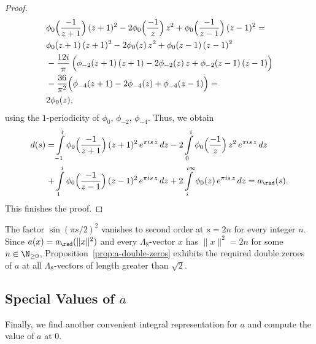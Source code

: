 \begin{proof}
\begin{align}&\phi_0\Big(\frac{-1}{z+1}\Big)\,(z+1)^2-2\phi_0\Big(\frac{-1}{z}\Big)\,z^2+
\phi_0\Big(\frac{-1}{z-1}\Big)\,(z-1)^2=\notag\\
&\phi_0(z+1)\,(z+1)^2-2\phi_0(z)\,z^2+\phi_0(z-1)\,(z-1)^2\notag\\
&-\frac{12i}{\pi}\,\Big(\phi_{-2}(z+1)\,(z+1)-2\phi_{-2}(z)\,z+\phi_{-2}(z-1)\,(z-1)\Big)\notag\\
&-\frac{36}{\pi^2}\Big(\phi_{-4}(z+1)-2\phi_{-4}(z)+\phi_{-4}(z-1)\Big)=\notag\\
&2\phi_0(z),
\end{align}
using the $1$-periodicity of $\phi_0$, $\phi_{-2}$, $\phi_{-4}$. Thus, we obtain
\begin{align}
    d(s)=&\int\limits_{-1}^{i}\phi_0\Big(\frac{-1}{z+1}\Big)\,(z+1)^2\,e^{\pi i s \,z}\,dz
    -2\int\limits_{0}^{i}\phi_0\Big(\frac{-1}{z}\Big)\,z^2\,e^{\pi i s \,z}\,dz\notag\\
    +&\int\limits_{1}^{i}\phi_0\Big(\frac{-1}{z-1}\Big)\,(z-1)^2\,e^{\pi i s \,z}\,dz
    +2\int\limits_{i}^{i\infty}\phi_0(z)\,e^{\pi i s \,z}\,dz=a_\rad(s).\notag
\end{align}
This finishes the proof.
\end{proof}

The factor $\sin(\pi s/2)^2$ vanishes to second order at $s = 2n$ for every integer $n$. Since $a(x) = a_\rad(\|x\|^2)$ and every $\Lambda_8$-vector $x$ has $\|x\|^2 = 2n$ for some $n \in \N_{\geq 0}$, Proposition~\ref{prop:a-double-zeros} exhibits the required double zeroes of $a$ at all $\Lambda_8$-vectors of length greater than $\sqrt 2$.

\subsection{Special Values of $a$}

Finally, we find another convenient integral representation for $a$ and compute the value of $a$ at $0$.

